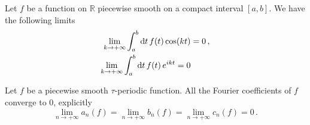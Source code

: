 \begin{corollary}
  Let $f$ be a function on $\mathbb{R}$ piecewise smooth on a compact interval
  $[a,b]$. We have the following limits
  \begin{align}
    \lim_{k\to+\infty}\int_a^b\mathrm{d} t\, f(t)\cos(kt)&=0\,,\\
    \lim_{k\to+\infty}\int_a^b\mathrm{d} t\, f(t)\,e^{ikt}=0
  \end{align}
\end{corollary}
\begin{corollary}
  Let $f$ be a piecewise smooth $\tau$-periodic function. All the
  Fourier coefficients of $f$ converge to $0$, explicitly
  \begin{equation}
    \lim_{n\to+\infty}a_n(f)=\lim_{n\to+\infty}b_n(f)=\lim_{n\to+\infty}c_n(f)=0\,.
  \end{equation}
\end{corollary}
